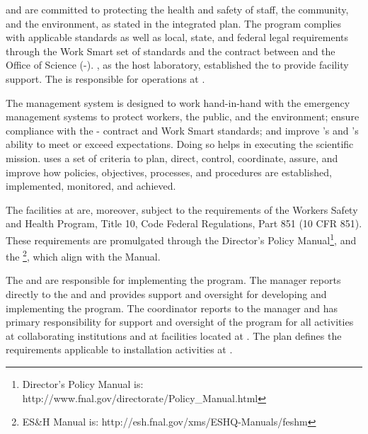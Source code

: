  and  are committed to protecting the health and
safety of staff, the community, and the environment, as stated in the
 integrated  plan.  The
 program complies with applicable standards as well as local,
state, and federal legal requirements through the  Work Smart set
of standards and the contract between  and the
 Office of Science (-). , as the host
laboratory, established the  to provide
facility support.  The  is responsible
for  operations at .

The   management system is
designed to work hand-in-hand with the  emergency
management systems to protect workers, the public, and the environment;
ensure compliance with the - contract and \fnal Work Smart
standards; and improve 's and 's ability to meet or
exceed expectations. Doing so helps in executing the
scientific mission.   uses a set of criteria to plan, direct,
control, coordinate, assure, and improve how  policies,
objectives, processes, and procedures are established, implemented,
monitored, and achieved. 

The  facilities at  are, moreover, subject to
the requirements of the  Workers Safety and Health Program,
Title 10, Code Federal Regulations, Part 851 (10 CFR 851). These
requirements are promulgated through the  Director's Policy
Manual\footnote{\fnal Director's Policy Manual is:
  http://www.fnal.gov/directorate/Policy\_Manual.html}, and the \footnote{\fnal ES\&H Manual is:
  http://esh.fnal.gov/xms/ESHQ-Manuals/feshm}, which
align with the   Manual.

The  and  are responsible for
implementing the   program.  The
  manager reports directly to the
 and  and provides
 support and oversight for developing and implementing the
  program. The  
coordinator reports to the  
manager and has primary responsibility for  support and
oversight of the   program for all activities
at collaborating institutions and at 
facilities located at . The   plan defines the 
requirements applicable to installation activities at . 

